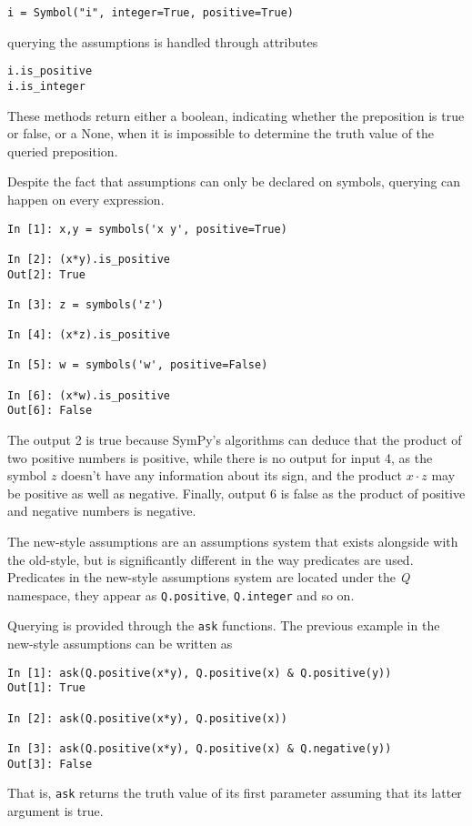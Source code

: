 \begin{verbatim}
i = Symbol("i", integer=True, positive=True)
\end{verbatim}

querying the assumptions is handled through attributes

\begin{verbatim}
i.is_positive
i.is_integer
\end{verbatim}

These methods return either a boolean, indicating whether the preposition is true or false,
or a None, when it is impossible to determine the truth value of the queried preposition.

Despite the fact that assumptions can only be declared on symbols, querying can
happen on every expression.

\begin{verbatim}
In [1]: x,y = symbols('x y', positive=True)

In [2]: (x*y).is_positive
Out[2]: True

In [3]: z = symbols('z')

In [4]: (x*z).is_positive

In [5]: w = symbols('w', positive=False)

In [6]: (x*w).is_positive
Out[6]: False
\end{verbatim}

The output 2 is true because SymPy's algorithms can deduce that the product of
two positive numbers is positive, while there is no output for input 4, as the
symbol $z$ doesn't have any information about its sign, and the product
$x\cdot z$ may be positive as well as negative.
Finally, output 6 is false as the product of positive and negative numbers is
negative.

The new-style assumptions are an assumptions system that exists alongside with
the old-style, but is significantly different in the way predicates are
used.
Predicates in the new-style assumptions system are located under the \textit{Q}
namespace, they appear as
\verb|Q.positive|, \verb|Q.integer| and so on.

Querying is provided through the \verb|ask| functions.
The previous example in the new-style assumptions can be written as
\begin{verbatim}
In [1]: ask(Q.positive(x*y), Q.positive(x) & Q.positive(y))
Out[1]: True

In [2]: ask(Q.positive(x*y), Q.positive(x))

In [3]: ask(Q.positive(x*y), Q.positive(x) & Q.negative(y))
Out[3]: False
\end{verbatim}
%
That is, \verb|ask| returns the truth value of its first parameter assuming
that its latter argument is true.

